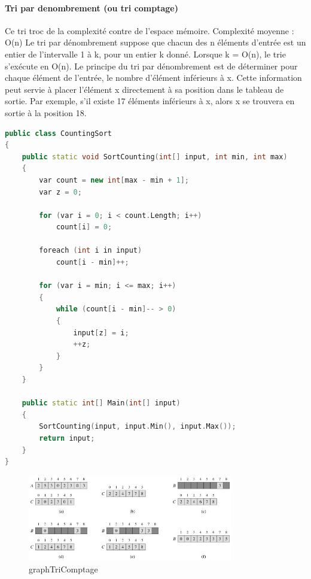 \documentclass[11pt, a4paper]{article}
\begin{document}
\paragraph{Tri par denombrement (ou tri comptage)}
Ce tri troc de la complexité contre de l'espace mémoire. Complexité moyenne : O(n)
\newline
Le tri par dénombrement suppose que chacun des n éléments d'entrée est un entier de l'intervalle 1 à k, pour un entier k donné. Lorsque k = O(n), le trie s'exécute en O(n).
\newline
Le principe du tri par dénombrement est de déterminer pour chaque élément de l'entrée, le nombre d'élément inférieurs à x. Cette information peut servie à placer l'élément x directement à sa position dans le tableau de sortie. Par exemple, s'il existe 17 éléments inférieurs à x, alors x se trouvera en sortie à la position 18.
\begin{lstlisting}[language=C++]
public class CountingSort
{
    public static void SortCounting(int[] input, int min, int max)
    {
        var count = new int[max - min + 1];
        var z = 0;

        for (var i = 0; i < count.Length; i++)
            count[i] = 0;

        foreach (int i in input)
            count[i - min]++;

        for (var i = min; i <= max; i++)
        {
            while (count[i - min]-- > 0)
            {
                input[z] = i;
                ++z;
            }
        }
    }

    public static int[] Main(int[] input)
    {
        SortCounting(input, input.Min(), input.Max());
        return input;
    }
}
\end{lstlisting}
\begin{figure}[h]
    \centering
    \includegraphics[width=0.8\textwidth]{graphTriComptage}
    \caption{graphTriComptage}
    \label{fig:graphTriComptage}
\end{figure}
\end{document}
